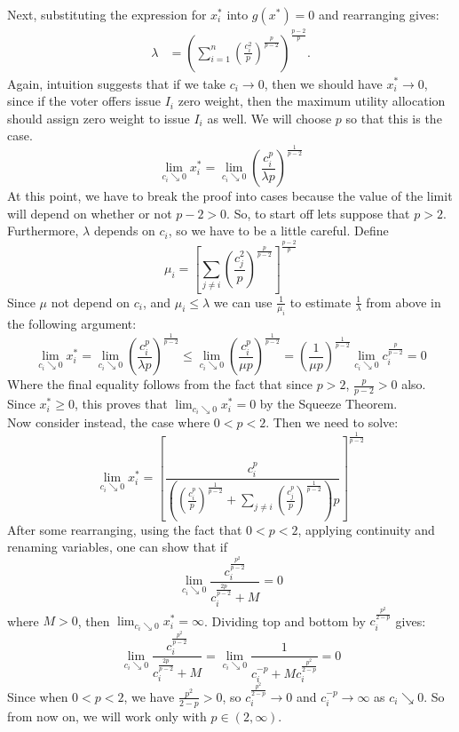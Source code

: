 \documentclass[
10pt, %
a4paper, %
oneside, %
headinclude,footinclude, %
BCOR5mm, %
]{scrartcl}
\begin{document}
Next, substituting the expression for $x_i^\ast$ into $g(x^\ast) = 0$ and rearranging gives:
\begin{align*}
\lambda &= \left(\sum_{i=1}^n \left(\frac{c_i^2}{p}\right)^\frac{p}{p-2}\right)^\frac{p-2}{p}.
\end{align*}
Again, intuition suggests that if we take $c_i\to 0$, then we should have $x_i^\ast \to 0$, since if the voter offers issue $I_i$ zero weight, then the maximum utility allocation should assign zero weight to issue $I_i$ as well. We will choose $p$ so that this is the case.
$$\lim_{c_i \searrow 0} x_i^\ast = \lim_{c_i \searrow 0} \left(\frac{c_i^p}{\lambda p}\right)^{\frac{1}{p-2}}$$
At this point, we have to break the proof into cases because the value of the limit will depend on whether or not $p-2 > 0$. So, to start off lets suppose that $p > 2$. Furthermore, $\lambda$ depends on $c_i$, so we have to be a little careful. Define
$$\mu_i = \left[ \sum_{j\neq i} \left(\frac{c_j^2}{p}\right)^\frac{p}{p-2}\right]^\frac{p-2}{p}$$
Since $\mu$ not depend on $c_i$, and $\mu_i \leq \lambda$ we can use $\frac{1}{\mu_i}$ to estimate $\frac{1}{\lambda}$ from above in the following argument:
$$\lim_{c_i \searrow 0} x_i^\ast = \lim_{c_i \searrow 0} \left(\frac{c_i^p}{\lambda p}\right)^{\frac{1}{p-2}} \leq \lim_{c_i \searrow 0} \left(\frac{c_i^p}{\mu p}\right)^{\frac{1}{p-2}} = \left(\frac{1}{\mu p}\right)^\frac{1}{p-2}\lim_{c_i \searrow 0} c_i^{\frac{p}{p-2}} = 0$$
Where the final equality follows from the fact that since $p > 2$, $\frac{p}{p-2}>0$ also. Since $x_i^\ast \geq 0$, this proves that $\lim_{c_i \searrow 0} x_i^\ast = 0$ by the Squeeze Theorem. \\

Now consider instead, the case where $0<p<2$. Then we need to solve:
$$\lim_{c_i \searrow 0} x_i^\ast = \left[ \frac{c_i^p}{\left( \left(\frac{c_i^p}{p}\right)^\frac{1}{p-2} + \sum_{j\neq i}\left( \frac{c_j^p}{p}\right)^\frac{1}{p-2}\right) p} \right]^\frac{1}{p-2}$$
After some rearranging, using the fact that $0<p<2$, applying continuity and renaming variables, one can show that if
$$\lim_{c_i \searrow 0} \frac{c_i^\frac{p^2}{p-2}}{c_i^\frac{2p}{p-2} + M} = 0$$
where $M > 0$, then $\lim_{c_i \searrow 0} x_i^\ast = \infty$. Dividing top and bottom by $c_i^\frac{p^2}{2-p}$ gives:
$$\lim_{c_i \searrow 0} \frac{c_i^\frac{p^2}{p-2}}{c_i^\frac{2p}{p-2} + M}  = \lim_{c_i \searrow 0} \frac{1}{c_i^{-p} + M c_i^\frac{p^2}{2-p}} = 0$$
Since when $0 < p < 2$, we have $\frac{p^2}{2-p} > 0$, so $c_i^\frac{p^2}{2-p} \rightarrow 0$ and $c_i^{-p} \rightarrow \infty$ as $c_i \searrow 0$. So from now on, we will work only with $p\in(2,\infty)$.
\end{document}

